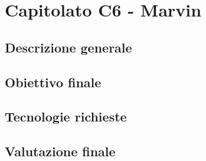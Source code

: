 \documentclass[main.tex]{subfiles}
\begin{document}
\chapter{Capitolato C6 - Marvin}
\section{Descrizione generale}
\section{Obiettivo finale}
\section{Tecnologie richieste}
\section{Valutazione finale}
\end{document}
